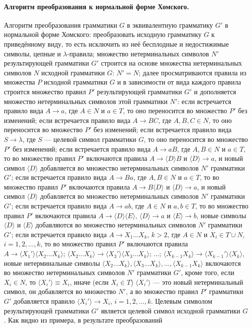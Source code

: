\documentclass[a4paper,12pt]{article}
\begin{document}
\paragraph{Алгоритм преобразования к нормальной форме Хомского.}
Алгоритм преобразования грамматики \(G\) в эквивалентную грамматику \(G'\) в нормальной форме Хомского: преобразовать исходную грамматику \(G\) к приведённому виду, то есть исключить из неё бесплодные и недостижимые символы, цепные и \(\lambda\)-правила; множество нетерминальных символов \(N'\) результирующей грамматики \(G'\) строится на основе множества нетерминальных символов \(N\) исходной грамматики \(G\): \(N'=N\); далее просматриваются правила из множества \(P\) исходной грамматики \(G\) и в зависимости от вида каждого правила строится множество правил \(P'\) результирующей грамматики \(G'\) и дополняется множество нетерминальных символов этой грамматики \(N'\): если встречается правило вида \(A\to a\), где \(A\in N\) и \(a\in T\), то оно переносится во множество \(P'\) без изменений; если встречается правило вида \(A\to BC\), где \(A,B,C\in N\), то оно переносится во множество \(P'\) без изменений; если встречается правило вида \(S\to\lambda\), где \(S\) — целевой символ грамматики \(G\), то оно переносится во множество \(P'\) без изменений; если встречается правило вида \(A\to aB\), где \(A,B\in N\) и \(a\in T\), то во множество правил \(P'\) включаются правила \(A\to\langle D\rangle B\) и \(\langle D\rangle\to a\), и новый символ \(\langle D\rangle\) добавляется во множество нетерминальных символов \(N'\) грамматики \(G'\); если встречается правило вида \(A\to Ba\), где \(A,B\in N\) и \(a\in T\), то во множество правил \(P'\) включаются правила \(A\to B\langle D\rangle\) и \(\langle D\rangle\to a\), и новый символ \(\langle D\rangle\) добавляется во множество нетерминальных символов \(N'\) грамматики \(G'\); если встречается правило вида \(A\to ab\), где \(A\in N\) и \(a,b\in T\), то во множество правил \(P'\) включаются правила \(A\to\langle D\rangle\langle E\rangle\), \(\langle D\rangle\to a\) и \(\langle E\rangle\to b\), новые символы \(\langle D\rangle\) и \(\langle E\rangle\) добавляются во множество нетерминальных символов \(N'\) грамматики \(G'\); если встречается правило вида \(A\to X_1\ldots X_k\), \(k>2\), где \(A\in N\) и \(X_i\in T\cup N\), \(i=1,2,\ldots,k\), то во множество правил \(P'\) включаются правила \(A\to\langle X_1'\rangle\langle X_2\ldots X_k\rangle\); \(\langle X_2\ldots X_k\rangle\to\langle X_3'\rangle\langle X_3\ldots X_k\rangle\); \(\ldots\); \(\langle X_{k-1}X_k\rangle\to\langle X_{k-1}'\rangle\langle X_k\rangle\), новые нетерминальные символы \(\langle X_2\ldots X_k\rangle,\langle X_3\ldots X_k\rangle,\ldots,\langle X_{k-1}X_k\rangle\) включаются во множество нетерминальных символов \(N'\) грамматики \(G'\), кроме того, если \(X_i\in N\), то \(\langle X_i'\rangle\equiv X_i\), иначе (если \(X_i\in T\)) \(\langle X_i'\rangle\) — это новый нетерминальный символ, он добавляется во множество \(N'\), а во множество правил \(P'\) грамматики \(G'\) добавляется правило \(\langle X_i'\rangle\to X_i\), \(i=1,2,\ldots,k\). Целевым символом результирующей грамматики \(G'\) является целевой символ исходной грамматики \(G\). Как видно из примера, в результате преобразований 
\end{document}
